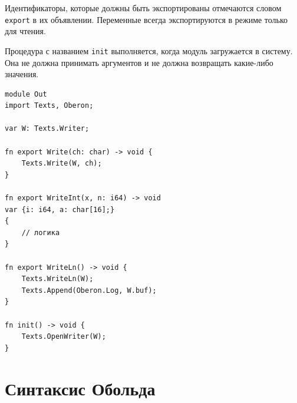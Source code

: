 \documentclass[a4paper,12pt]{article}
\begin{document}
    Идентификаторы, которые должны быть экспортированы отмечаются словом \texttt{export} в их объявлении. Переменные всегда экспортируются в режиме только для чтения.

    Процедура с названием \texttt{init} выполняется, когда модуль загружается в систему. Она не должна принимать аргументов и не должна возвращать какие-либо значения.

    \begin{center}
        \begin{minipage}[t]{0.5\textwidth}
            \begin{lstlisting}[style=obouldstyle]
module Out
import Texts, Oberon;

var W: Texts.Writer;

fn export Write(ch: char) -> void {
    Texts.Write(W, ch);
}

fn export WriteInt(x, n: i64) -> void
var {i: i64, a: char[16];}
{
    // логика
}

fn export WriteLn() -> void {
    Texts.WriteLn(W);
    Texts.Append(Oberon.Log, W.buf);
}

fn init() -> void {
    Texts.OpenWriter(W);
}

            \end{lstlisting}
        \end{minipage}
    \end{center}

    \section{Синтаксис Обольда}
\end{document}
